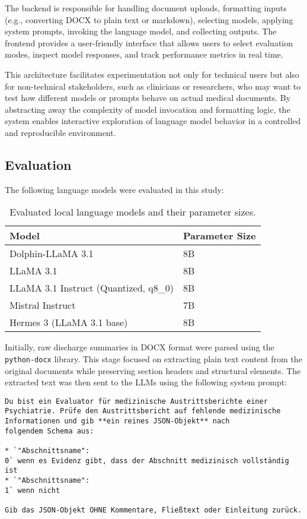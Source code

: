 The backend is responsible for handling document uploads, formatting inputs (e.g., converting DOCX to plain text or markdown), selecting models, applying system prompts, invoking the language model, and collecting outputs. The frontend provides a user-friendly interface that allows users to select evaluation modes, inspect model responses, and track performance metrics in real time.

This architecture facilitates experimentation not only for technical users but also for non-technical stakeholders, such as clinicians or researchers, who may want to test how different models or prompts behave on actual medical documents. By abstracting away the complexity of model invocation and formatting logic, the system enables interactive exploration of language model behavior in a controlled and reproducible environment.

\subsection{Evaluation}
The following language models were evaluated in this study:

\begin{table}[H]
\centering
\begin{tabular}{l l}
\toprule
\textbf{Model} & \textbf{Parameter Size} \\
\midrule
Dolphin-LLaMA 3.1 & 8B \\
LLaMA 3.1 & 8B \\
LLaMA 3.1 Instruct (Quantized, q8\_0) & 8B \\
Mistral Instruct & 7B \\
Hermes 3 (LLaMA 3.1 base) & 8B \\
\bottomrule
\end{tabular}
\caption{Evaluated local language models and their parameter sizes.}
\label{tab:llm_models}
\end{table}

Initially, raw discharge summaries in DOCX format were parsed 
using the \texttt{python-docx} library. This stage focused on extracting 
plain text content from the original documents while preserving section 
headers and structural elements. The extracted text was then sent to the LLMs
using the following system prompt:
\begin{promptbox}
\begin{verbatim}
Du bist ein Evaluator für medizinische Austrittsberichte einer 
Psychiatrie. Prüfe den Austrittsbericht auf fehlende medizinische 
Informationen und gib **ein reines JSON-Objekt** nach 
folgendem Schema aus:

* `"Abschnittsname": 
0` wenn es Evidenz gibt, dass der Abschnitt medizinisch vollständig ist
* `"Abschnittsname": 
1` wenn nicht

Gib das JSON-Objekt OHNE Kommentare, Fließtext oder Einleitung zurück.
\end{verbatim}
\end{promptbox}

